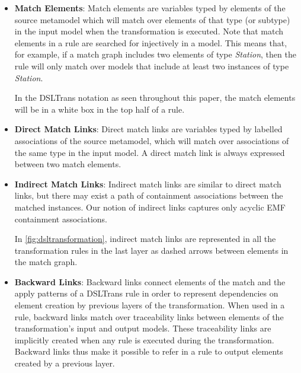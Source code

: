 \begin{itemize}
\item \textbf{Match Elements}: Match elements are variables typed by elements of the source
metamodel which will match over elements of that type (or subtype) in the
input model when the transformation is executed. Note that match
elements in a rule are searched for injectively in a model. This means that, for
example, if a match graph includes two elements of type \emph{Station}, then the rule will only match over models that include at least two instances of type \emph{Station}.

In the DSLTrans notation as seen throughout this paper, the match elements will be in a white box in the top half of a rule.\\

\item \textbf{Direct Match Links}: Direct match links are variables typed by labelled associations of the source metamodel, which will match over associations of the same type in the input model. A direct match link is always expressed between two match elements.\\

\item \textbf{Indirect Match Links}: Indirect match links are similar to direct
match links, but there may exist a path of containment associations between the
matched instances. Our notion of indirect links captures only
acyclic EMF containment associations. 


In \cref{fig:dsltransformation}, indirect match links are represented in all the
transformation rules in the last layer as dashed arrows between elements in the match graph.\\

\item \textbf{Backward Links}: Backward links connect elements of the match and
the apply patterns of a DSLTrans rule in order to represent dependencies on
element creation by previous layers of the transformation. When used in a rule,
backward links match over traceability links between elements of the
transformation's input and output models.
These traceability links are implicitly created when any rule is executed during the transformation. Backward
links thus make it possible to refer in a rule to output elements created by a
previous layer.


\end{itemize}
